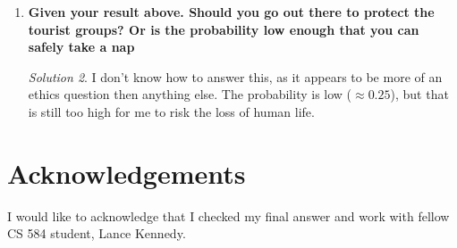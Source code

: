 \documentclass[a4paper,12pt]{article}
\theoremstyle{definition}
\theoremstyle{remark}
\newtheorem*{solution}{Solution}
\begin{document}
\begin{enumerate}
\begin{solution}
			If we want lower, we can recognized that we only have to do 3 multiplications for two binomials, so using divide and conquer algorithms, we can get $\order{n^{\lg3}}$. If we desire faster, we can use the FFT and iFFT (both done in $\order{n\lg n}$ with $n$ evalutations for the interpolation, so doing this process $\lg w$, we end up with an $\order{n\lg^2n}$ algorithm.
		\end{solution} 
		\item {\bf Given your result above. Should you go out there to protect the tourist groups? Or is the probability low
			enough that you can safely take a nap}
			\begin{solution}
				I don't know how to answer this, as it appears to be more of an ethics question then anything else. The probability is low ($\approx 0.25$), but that is still too high for me to risk the loss of human life.
			\end{solution}
		
		
	\end{enumerate}
	
	\section*{Acknowledgements}
	I would like to acknowledge that I checked my final answer and work with fellow CS 584 student, Lance Kennedy.
	
\end{document}
